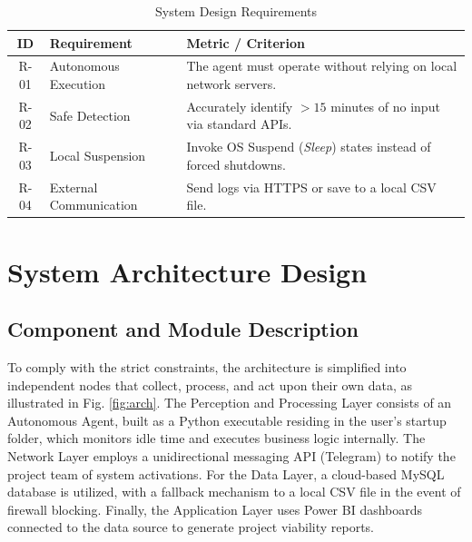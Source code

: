 \documentclass[conference]{IEEEtran}
\begin{document}
\begin{table}[htbp]
\caption{System Design Requirements}
\label{tab:requirements}
\centering
\begin{tabular}{|c|p{2.5cm}|p{4cm}|}
\hline
\textbf{ID} & \textbf{Requirement} & \textbf{Metric / Criterion} \\
\hline
R-01 & Autonomous Execution & The agent must operate without relying on local network servers. \\
\hline
R-02 & Safe Detection & Accurately identify $>15$ minutes of no input via standard APIs. \\
\hline
R-03 & Local Suspension & Invoke OS Suspend (\textit{Sleep}) states instead of forced shutdowns. \\
\hline
R-04 & External Communication & Send logs via HTTPS or save to a local CSV file. \\
\hline
\end{tabular}
\end{table}

\section{System Architecture Design}

\subsection{Component and Module Description}
To comply with the strict constraints, the architecture is simplified into independent nodes that collect, process, and act upon their own data, as illustrated in Fig. \ref{fig:arch}. The Perception and Processing Layer consists of an Autonomous Agent, built as a Python executable residing in the user's startup folder, which monitors idle time and executes business logic internally. The Network Layer employs a unidirectional messaging API (Telegram) to notify the project team of system activations. For the Data Layer, a cloud-based MySQL database is utilized, with a fallback mechanism to a local CSV file in the event of firewall blocking. Finally, the Application Layer uses Power BI dashboards connected to the data source to generate project viability reports.
\end{document}
